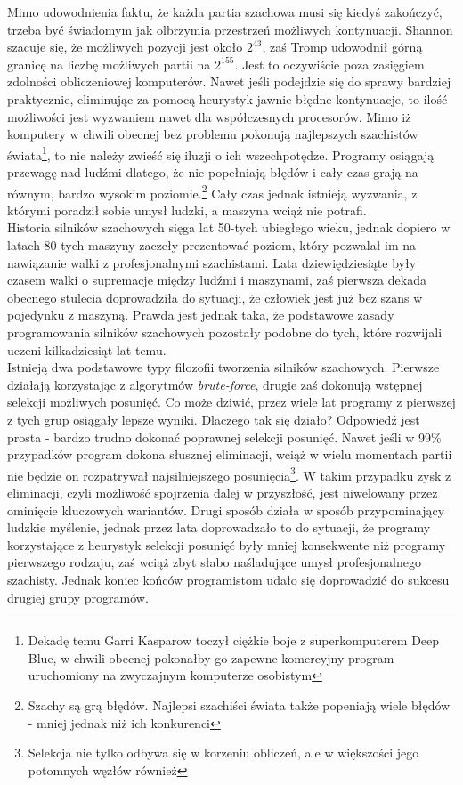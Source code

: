 \documentclass[12pt,leqno]{article}
\begin{document}
Mimo udowodnienia faktu, że każda partia szachowa musi się kiedyś zakończyć, trzeba być świadomym jak olbrzymia przestrzeń możliwych kontynuacji. Shannon szacuje się, że możliwych pozycji jest około $2^{43}$\cite{2}, zaś Tromp udowodnił górną granicę na liczbę możliwych partii na $2^{155}$\cite{3}.  Jest to oczywiście poza zasięgiem zdolności obliczeniowej komputerów. Nawet jeśli podejdzie się do sprawy bardziej praktycznie, eliminując za pomocą heurystyk jawnie błędne kontynuacje, to ilość możliwości jest wyzwaniem nawet dla współczesnych procesorów. Mimo iż komputery w chwili obecnej bez problemu pokonują najlepszych szachistów świata\footnote{Dekadę temu Garri Kasparow toczył ciężkie boje z superkomputerem Deep Blue, w chwili obecnej pokonałby go zapewne komercyjny program uruchomiony na zwyczajnym komputerze osobistym}, to nie należy zwieść się iluzji o ich wszechpotędze. Programy osiągają przewagę nad ludźmi dlatego, że nie popełniają błędów i cały czas grają na równym, bardzo wysokim poziomie.\footnote{Szachy są grą błędów. Najlepsi szachiści świata także popeniają wiele błędów - mniej jednak niż ich konkurenci} Cały czas jednak istnieją wyzwania, z którymi poradził sobie umysł ludzki, a maszyna wciąż nie potrafi. \\
\indent Historia silników szachowych sięga lat 50-tych ubiegłego wieku, jednak dopiero w latach 80-tych maszyny zaczeły prezentować poziom, który pozwalał im na nawiązanie walki z profesjonalnymi szachistami. Lata dziewiędziesiąte były czasem walki o supremacje między ludźmi i maszynami, zaś pierwsza dekada obecnego stulecia doprowadziła do sytuacji, że człowiek jest już bez szans w pojedynku z maszyną. Prawda jest jednak taka, że podstawowe zasady programowania silników szachowych pozostały podobne do tych, które rozwijali uczeni kilkadziesiąt lat temu. \\

\indent Istnieją dwa podstawowe typy filozofii tworzenia silników szachowych. Pierwsze działają korzystając z algorytmów {\it brute-force}, drugie zaś dokonują wstępnej selekcji możliwych posunięć. Co może dziwić, przez wiele lat programy z pierwszej z tych grup osiągały lepsze wyniki. Dlaczego tak się działo? Odpowiedź jest prosta - bardzo trudno dokonać poprawnej selekcji posunięć. Nawet jeśli w 99\% przypadków program dokona słusznej eliminacji, wciąż w wielu momentach partii nie będzie on rozpatrywał najsilniejszego posunięcia\footnote{Selekcja nie tylko odbywa się w korzeniu obliczeń, ale w większości jego potomnych węzłów również}. W takim przypadku zysk z eliminacji, czyli możliwość spojrzenia dalej w przyszłość, jest niwelowany przez ominięcie kluczowych wariantów. Drugi sposób działa w sposób przypominający ludzkie myślenie, jednak przez lata doprowadzało to do sytuacji, że programy korzystające z heurystyk selekcji posunięć były mniej konsekwente niż programy pierwszego rodzaju, zaś wciąż zbyt słabo naśladujące umysł profesjonalnego szachisty. Jednak koniec końców programistom udało się doprowadzić do sukcesu drugiej grupy programów.\\
\end{document}
